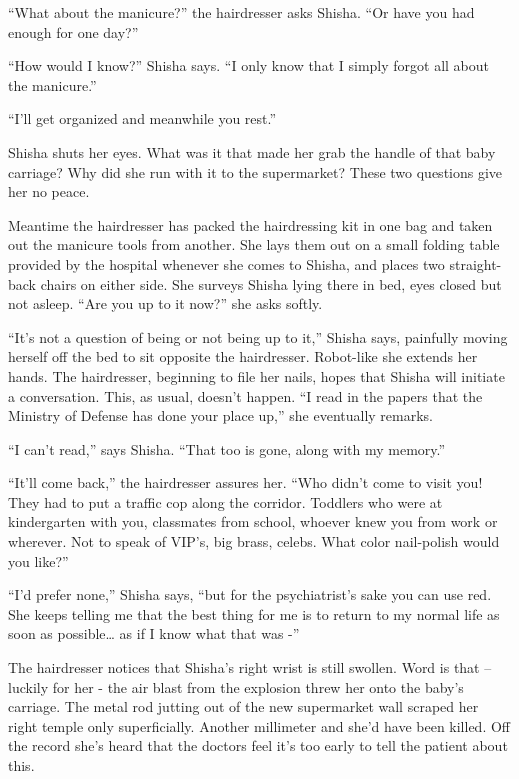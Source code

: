 \documentclass[twoside,11pt]{book}
\begin{document}
``What about the manicure?'' the hairdresser asks Shisha. ``Or have you had
enough for one day?''

``How would I know?'' Shisha says. ``I only know that I simply forgot all about
the manicure.''

``I'll get organized and meanwhile you rest.''

Shisha shuts her eyes. What was it that made her grab the handle of that baby carriage? Why did she run with it to the
supermarket? These two questions give her no peace.

Meantime the hairdresser has packed the hairdressing kit in one bag and taken out the manicure tools from another. She
lays them out on a small folding table provided by the hospital whenever she comes to Shisha, and places two
straight-back chairs on either side. She surveys Shisha lying there in bed, eyes closed but not asleep.
``Are you up to it now?'' she asks softly.

``It's not a question of being or not being up to it,'' Shisha says, painfully{
}moving herself off the bed to sit opposite the hairdresser. Robot-like she extends her hands. The hairdresser,
beginning to file her nails, hopes that Shisha will initiate a conversation. This, as usual, doesn't happen.
``I read in the papers that the Ministry of Defense has done your place up,'' she eventually
remarks.

``I can't read,'' says Shisha. ``That too is gone, along with my
memory.''

``It'll come back,'' the hairdresser assures her. ``Who didn't come to visit you!
They had to put a traffic cop along the corridor. Toddlers who were at kindergarten with you, classmates from school,
whoever knew you from work or wherever. Not to speak of VIP's, big brass, celebs. What color nail-polish would you
like?''

``I'd{ }prefer none,'' Shisha says, ``but
for the psychiatrist's sake you can use red. She keeps telling me that the best thing for me is to return to my normal
life as soon as possible{\ldots} as if I know what that was -''

The hairdresser notices that Shisha's right wrist is still swollen. Word is that -- luckily for her - the air blast from
the explosion threw her onto the baby's carriage. The metal rod jutting out of the new supermarket wall scraped her
right temple only superficially. Another millimeter and she'd have been killed. Off the record she's heard that the
doctors feel it's too early to tell the patient about this.
\end{document}
